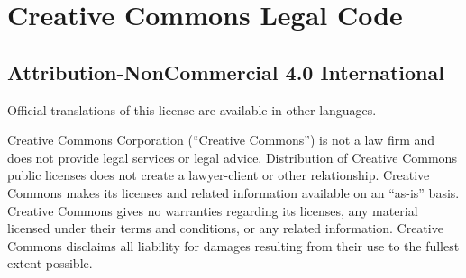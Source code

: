 \section{Creative Commons Legal Code}

\subsection{Attribution-NonCommercial 4.0 International}






Official translations of this license are available in other languages.



\par Creative Commons Corporation (“Creative Commons”) is not a law firm and does not provide legal services or legal advice. Distribution of Creative Commons public licenses does not create a lawyer-client or other relationship. Creative Commons makes its licenses and related information available on an “as-is” basis. Creative Commons gives no warranties regarding its licenses, any material licensed under their terms and conditions, or any related information. Creative Commons disclaims all liability for damages resulting from their use to the fullest extent possible.


